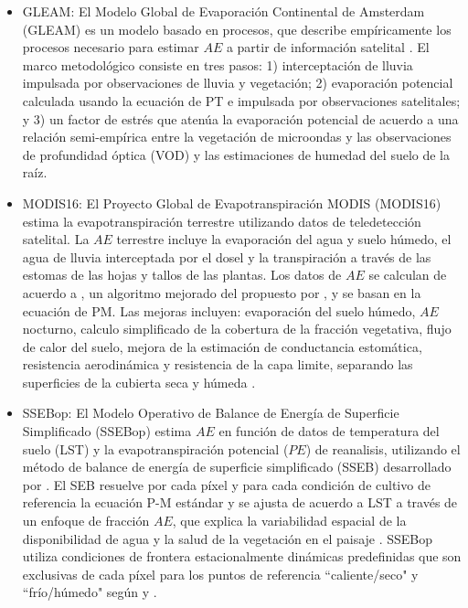 \documentclass[12pt]{article}
\begin{document}
\begin{itemize}
	\item GLEAM: El Modelo Global de Evaporación Continental de Amsterdam (GLEAM) es un modelo basado en procesos, que describe empíricamente los procesos necesario para estimar $AE$ a partir de información satelital \citep{Martens2017}. El marco metodológico consiste en tres pasos: 1) interceptación de lluvia impulsada por observaciones de lluvia y vegetación; 2) evaporación potencial calculada usando la ecuación de PT e impulsada por observaciones satelitales; y 3) un factor de estrés que atenúa la evaporación potencial de acuerdo a una relación semi-empírica entre la vegetación de microondas y las observaciones de profundidad óptica (VOD) y las estimaciones de humedad del suelo de la raíz. %
	
	\item MODIS16: El Proyecto Global de Evapotranspiración MODIS (MODIS16) estima la evapotranspiración terrestre utilizando datos de teledetección satelital. La $AE$ terrestre incluye la evaporación del agua y suelo húmedo, el agua de lluvia interceptada por el dosel y la transpiración a través de las estomas de las hojas y tallos de las plantas. Los datos de $AE$ se calculan de acuerdo a \citet{mu2013modis}, un algoritmo mejorado del propuesto por \citet{mu2007development}, y se basan en la ecuación de PM. Las mejoras incluyen: evaporación del suelo húmedo, $AE$ nocturno, calculo simplificado de la cobertura de la fracción vegetativa, flujo de calor del suelo, mejora de la estimación de conductancia estomática, resistencia aerodinámica y resistencia de la capa limite, separando las superficies de la cubierta seca y húmeda \citep{mu2013modis}.
	
	\item SSEBop: El Modelo Operativo de Balance de Energía de Superficie Simplificado (SSEBop) estima $AE$ en función de datos de temperatura del suelo (LST) y la evapotranspiración potencial ($PE$) de reanalisis, utilizando el método de balance de energía de superficie simplificado (SSEB) desarrollado por \citet{senay2007coupled,senay2011enhancing}. El SEB resuelve por cada píxel y para cada condición de cultivo de referencia la ecuación P-M estándar y se ajusta de acuerdo a LST a través de un enfoque de fracción $AE$, que explica la variabilidad espacial de la disponibilidad de agua y la salud de la vegetación en el paisaje \citep{savoca2013actual}. SSEBop utiliza condiciones de frontera estacionalmente dinámicas predefinidas que son exclusivas de cada píxel para los puntos de referencia ``caliente/seco" y ``frío/húmedo" según \citet{bastiaanssen2014earth} y \citet{allen2007satellite}.
	

\end{itemize}
\end{document}

